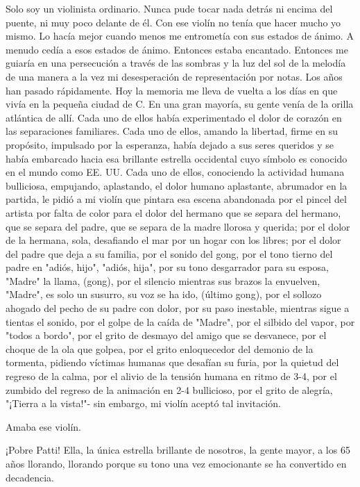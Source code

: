 \documentclass[12pt]{book}
\begin{document}
Solo soy un violinista ordinario. Nunca pude tocar nada detrás ni encima del puente, ni muy poco delante de él. Con ese violín no tenía que hacer mucho yo mismo. Lo hacía mejor cuando menos me entrometía con sus estados de ánimo. A menudo cedía a esos estados de ánimo. Entonces estaba encantado. Entonces me guiaría en una persecución a través de las sombras y la luz del sol de la melodía de una manera a la vez mi desesperación de representación por notas. Los años han pasado rápidamente. Hoy la memoria me lleva de vuelta a los días en que vivía en la pequeña ciudad de C. En una gran mayoría, su gente venía de la orilla atlántica de allí. Cada uno de ellos había experimentado el dolor de corazón en las separaciones familiares. Cada uno de ellos, amando la libertad, firme en su propósito, impulsado por la esperanza, había dejado a sus seres queridos y se había embarcado hacia esa brillante estrella occidental cuyo símbolo es conocido en el mundo como EE. UU. Cada uno de ellos, conociendo la actividad humana bulliciosa, empujando, aplastando, el dolor humano aplastante, abrumador en la partida, le pidió a mi violín que pintara esa escena abandonada por el pincel del artista por falta de color para el dolor del hermano que se separa del hermano, que se separa del padre, que se separa de la madre llorosa y querida; por el dolor de la hermana, sola, desafiando el mar por un hogar con los libres; por el dolor del padre que deja a su familia, por el sonido del gong, por el tono tierno del padre en "adiós, hijo", "adiós, hija", por su tono desgarrador para su esposa, "Madre" la llama, (gong), por el silencio mientras sus brazos la envuelven, "Madre", es solo un susurro, su voz se ha ido, (último gong), por el sollozo ahogado del pecho de su padre con dolor, por su paso inestable, mientras sigue a tientas el sonido, por el golpe de la caída de "Madre", por el silbido del vapor, por "todos a bordo", por el grito de desmayo del amigo que se desvanece, por el choque de la ola que golpea, por el grito enloquecedor del demonio de la tormenta, pidiendo víctimas humanas que desafían su furia, por la quietud del regreso de la calma, por el alivio de la tensión humana en ritmo de 3-4, por el zumbido del regreso de la animación en 2-4 bullicioso, por el grito de alegría, "¡Tierra a la vista!"- sin embargo, mi violín aceptó tal invitación.

Amaba ese violín.

¡Pobre Patti! Ella, la única estrella brillante de nosotros, la gente mayor, a los 65 años llorando, llorando porque su tono una vez emocionante se ha convertido en decadencia.
\end{document}
